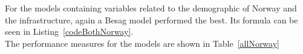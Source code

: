 For the models containing variables related to the demographic of Norway and the infrastructure, again a Besag model performed the best. Its formula can be seen in Listing~\ref{codeBothNorway}. \\
The performance measures for the models are shown in Table~\ref{allNorway}
